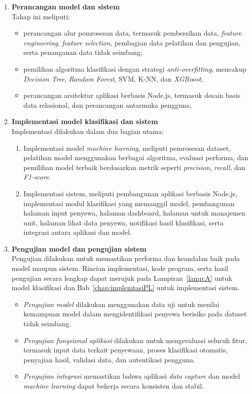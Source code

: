 \begin{enumerate}
    \item \textbf{Perancangan model dan sistem} \\
    Tahap ini meliputi:
    \begin{itemize}
        \item perancangan alur pemrosesan data, termasuk pembersihan data, \textit{feature engineering}, \textit{feature selection}, pembagian data pelatihan dan pengujian, serta penanganan data tidak seimbang;
        \item pemilihan algoritma klasifikasi dengan strategi \textit{anti-overfitting}, mencakup \textit{Decision Tree}, \textit{Random Forest}, {SVM}, {K-NN}, dan \textit{XGBoost};
        \item perancangan arsitektur aplikasi berbasis Node.js, termasuk desain basis data relasional, dan perancangan antarmuka pengguna;
    \end{itemize}
    
    \item \textbf{Implementasi model klasifikasi dan sistem} \\
    Implementasi dilakukan dalam dua bagian utama:
    \begin{enumerate}
        \item {Implementasi model {\it machine learning}}, meliputi pemrosesan dataset, pelatihan model menggunakan berbagai algoritma, evaluasi performa, dan pemilihan model terbaik berdasarkan metrik seperti \textit{precision}, \textit{recall}, dan \textit{F1-score}.
        \item {Implementasi sistem}, meliputi pembangunan aplikasi berbasis Node.js, implementasi modul klasifikasi yang memanggil model, pembangunan halaman input penyewa, halaman dashboard, halaman untuk manajemen unit, halaman lihat data penyewa, notifikasi hasil klasifikasi, serta integrasi antara aplikasi dan model.
    \end{enumerate}
    
    \item \textbf{Pengujian model dan pengujian sistem} \\
    Pengujian dilakukan untuk memastikan performa dan keandalan baik pada model maupun sistem. Rincian implementasi, kode program, serta hasil pengujian secara lengkap dapat merujuk pada Lampiran~\ref{lamp:A} untuk model klasifikasi dan Bab~\ref{chap:implemtasiPL} untuk implementasi sistem.
    \begin{itemize}
        \item \textit{Pengujian model} dilakukan menggunakan data uji untuk menilai kemampuan model dalam mengidentifikasi penyewa berisiko pada dataset tidak seimbang.
        \item \textit{Pengujian fungsional aplikasi} dilakukan untuk mengevaluasi seluruh fitur, termasuk input data terkait penyewaan, proses klasifikasi otomatis, penyajian hasil, validasi data, dan autentikasi pengguna.
        \item \textit{Pengujian integrasi} memastikan bahwa aplikasi \textit{data capture} dan model \textit{machine learning} dapat bekerja secara konsisten dan stabil.
    \end{itemize}
    

\end{enumerate}
